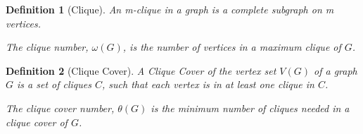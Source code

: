 \documentclass[12pt]{article}
\theoremstyle{parenbold}
\newtheorem{definition}{Definition}[section]
\begin{document}
\begin{definition}[Clique]
An m-clique in a graph is a complete subgraph on m vertices. \cite{elzinga2007minimum}

The clique number, $\omega(G)$, is the number of vertices in a maximum clique of $G$.

\end{definition}

\begin{definition}[Clique Cover]
A Clique Cover of the vertex set $V(G)$ of a graph $G$ is a set of cliques $C$, such that each vertex is in at least one clique in $C$. 

The clique cover number, $\theta(G)$ is the minimum number of cliques needed in a clique cover of $G$. \cite{elzinga2007minimum}

\end{definition}
\end{document}
